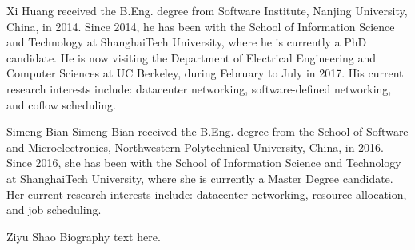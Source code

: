 \documentclass[10pt,journal,compsoc]{IEEEtran}
\begin{document}
\begin{IEEEbiography}{Xi Huang}
received the B.Eng. degree from Software Institute, Nanjing University, China, in 2014. Since 2014, he has been with the School of Information Science and Technology at ShanghaiTech University, where he is currently a PhD candidate. He is now visiting the Department of Electrical Engineering and Computer Sciences at UC Berkeley, during February to July in 2017. His current research interests include: datacenter networking, software-defined networking, and coflow scheduling.
\end{IEEEbiography}

\begin{IEEEbiography}{Simeng Bian}
Simeng Bian received the B.Eng. degree from the School of Software and Microelectronics, Northwestern Polytechnical University, China, in 2016. Since 2016, she has been with the School of Information Science and Technology at ShanghaiTech University, where she is currently a Master Degree candidate. Her current research interests include: datacenter networking, resource allocation, and job scheduling.
\end{IEEEbiography}


\begin{IEEEbiography}{Ziyu Shao}
Biography text here.
\end{IEEEbiography}
\end{document}
